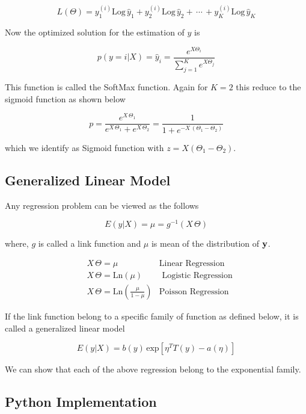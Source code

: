 \documentclass[11pt]{article}
\theoremstyle{definition}
\begin{document}
$$
L(\Theta) = y^{(i)}_1 \text{Log}\, \hat{y}_1 + y^{(i)}_2 \text{Log}\, \hat{y}_2 + \, \cdots \, + y^{(i)}_K \text{Log}\, \hat{y}_K
$$


Now the optimized solution for the estimation of $y$ is 

$$
p(y=i|X) = \hat{y}_i = \frac{e^{X\Theta_i}}{\sum_{j=1}^K e^{X\Theta_j}}
$$

This function is called the SoftMax function. Again for $K=2$ this reduce to the sigmoid function as shown below 

$$
p = \frac{e^{X\,\Theta_1}}{e^{X\,\Theta_1}+e^{X\,\Theta_2}} = \frac{1}{1+e^{-X\,(\Theta_1 - \Theta_2)}}
$$

which we identify as Sigmoid function with $z= X(\Theta_1 - \Theta_2)$. 



\subsection{Generalized Linear Model }

Any regression problem can be viewed as the follows 

$$
E(y|X) = \mu = g^{-1} (X\,\Theta)
$$

where, $g$ is called a link function and $\mu$ is mean of the distribution of $\bf{y}$. 

\begin{align*}
    & X\, \Theta = \mu & \text{Linear Regression} \\
    & X\, \Theta = \text{Ln}(\mu)  & \text{ Logistic Regression}\\
    & X\, \Theta = \text{Ln}\left(\frac{\mu}{1-\mu} \right) & \text{Poisson Regression}
\end{align*}

If the link function belong to a specific family of function as defined below, it is called a generalized linear model

$$
E(y|X) = b(y) \, \text{exp}\left[\eta^T T(y) - a(\eta)\right]
$$

We can show that each of the above regression belong to the exponential family. 


\subsection{Python Implementation}
\end{document}
